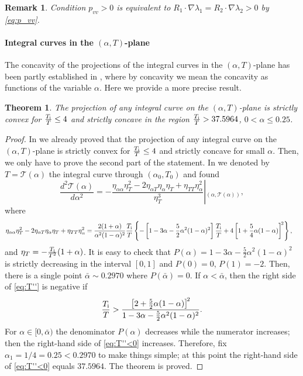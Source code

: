 \documentclass[10pt,a4paper]{article}
\newtheorem{theorem}{Theorem}[section]
\newtheorem{nb}{Remark}[section]
\numberwithin{equation}{section}
\begin{document}
\begin{nb}\label{nb:invariance_1}
Condition $p_{vv} > 0$ is equivalent to $R_1\cdot \nabla \lambda_1 = R_2\cdot \nabla \lambda_2 > 0$ by \eqref{eq:p_vv}. 
\end{nb} 

%
\paragraph{Integral curves in the $(\alpha,T)$-plane}
The concavity of the projections of the integral curves in the $(\alpha,T)$-plane has been partly established in \cite{Asakura-Corli_ionized}, where by concavity we mean the concavity as functions of the variable $\alpha$. Here we provide a more precise result.

\begin{theorem}\label{thm:concave T}
The projection of any integral curve on the $(\alpha,T)$-plane is strictly convex for $\frac{T_{\rm i}}{T} \leq 4$ and strictly concave in the region $\frac{T_{\rm i}}{T} >  37.5964$, $0 < \alpha \leq0.25$.
\end{theorem}
%
\begin{proof}
In \cite[Lemma 7.1]{Asakura-Corli_ionized} we already proved that the projection of any integral curve on the $(\alpha,T)$-plane is strictly convex for $\frac{T_{\rm i}}{T} \leq 4$ and strictly concave for small $\alpha.$
Then, we only have to prove the second part of the statement. In \cite{Asakura-Corli_ionized} we denoted by $T=\mathcal{T}(\alpha)$ the integral curve through $(\alpha_0,T_0)$ and found 
\begin{equation}\label{eq:T''}
   \frac{d^2\mathcal{T}(\alpha)}{d\alpha^2} =
-\left. \frac{\eta_{\alpha\alpha}\eta_T^2 - 2 \eta_{\alpha T}\eta_{\alpha}\eta_T + \eta_{TT}\eta_{\alpha}^2}{\eta_T^3}\right|{}_{\left(\alpha,\mathcal{T}(\alpha)\right)},
\end{equation}
where
\begin{align*}
\eta_{\alpha\alpha}\eta_T^2 - 2 \eta_{\alpha T}\eta_{\alpha}\eta_T + \eta_{TT}\eta_{\alpha}^2
&= \frac{2(1+\alpha)}{\alpha^2(1-\alpha)^2}\frac{T_{\rm i}}{T}\left\{-\left[1 - 3\alpha - \frac{5}{2}\alpha^2(1 - \alpha)^2\right]\frac{T_{\rm i}}{T} + 4\left[1 + \frac{5}{4}\alpha(1 - \alpha)\right]^{\! 2}\right\},
\end{align*}
and $\eta_T= - \frac{T_{\rm i}}{T^{2}}(1 + \alpha)$. It is easy to check that $P(\alpha) = 1-3\alpha -\frac52\alpha^2(1-\alpha)^2$ is strictly decreasing in the interval $[0,1]$ and $P(0)=0$, $P(1)=-2$. Then, there is a single point $\bar \alpha\sim 0.2970$ where $P(\bar\alpha)=0$. If $\alpha<\bar\alpha$, then the right side of \eqref{eq:T''} is negative if 
\begin{equation}\label{eq:T''<0}
\frac{T_{\rm i}}{T} >  \frac{\left[2 + \frac{5}{2}\alpha(1 - \alpha)\right]^{\! 2}}{1 - 3\alpha - \frac{5}{2}\alpha^2(1 - \alpha)^2}.
\end{equation}
For $\alpha\in[0,\bar\alpha)$ the denominator $P(\alpha)$ decreases while the numerator increases;  then the right-hand side of \eqref{eq:T''<0} increases. Therefore, fix $\alpha_1 = 1/4=0.25 < 0.2970$ to make things simple; at this point the right-hand side of \eqref{eq:T''<0} equals $37.5964$. The theorem is proved.
\end{proof}
\end{document}
